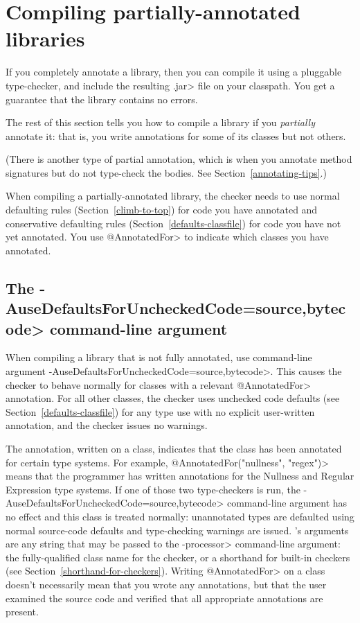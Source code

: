 \section{Compiling partially-annotated libraries\label{compiling-libraries}}

If you completely annotate a library, then you can compile it using a
pluggable type-checker, and include the resulting \<.jar> file on your
classpath.  You get a guarantee that the library contains no errors.

The rest of this section tells you how to compile a library if you
\emph{partially} annotate it:  that is, you write annotations for some of its
classes but not others.

(There is another type of partial annotation, which is when you annotate
method signatures but do not type-check the bodies.
See Section~\ref{annotating-tips}.)

When compiling a partially-annotated library, the checker needs to use normal
defaulting rules (Section~\ref{climb-to-top}) for code you have annotated and
conservative defaulting rules (Section~\ref{defaults-classfile}) for
code you have not yet annotated.
You use \<@AnnotatedFor> to indicate which classes you have annotated.



\subsection{The \<-AuseDefaultsForUncheckedCode=source,bytecode> command-line argument\label{AuseDefaultsForUncheckedCodesource}}

\begin{sloppypar}
When compiling a library that is not fully annotated, use command-line
argument \<-AuseDefaultsForUncheckedCode=source,bytecode>.  This causes
the checker to behave normally for classes with a relevant \<@AnnotatedFor>
annotation.  For all other classes, the checker uses unchecked code defaults
(see Section~\ref{defaults-classfile}) for any type use with no explicit
user-written annotation, and the checker issues no warnings.
\end{sloppypar}

The  annotation, written on a
class, indicates that the class has been annotated for certain type
systems.  For example, \<@AnnotatedFor(\ttlcb"nullness", "regex"\ttrcb)> means that
the programmer has written annotations for the Nullness and Regular
Expression type systems.  If one of those two type-checkers is run,
the \<-AuseDefaultsForUncheckedCode=source,bytecode> command-line argument
has no effect and this class is treated normally:
unannotated types are defaulted using normal source-code
defaults and type-checking warnings are issued.
's arguments are any string that
may be passed to the \<-processor> command-line argument:  the
fully-qualified class name for the checker, or a shorthand for built-in
checkers (see Section~\ref{shorthand-for-checkers}).
Writing \<@AnnotatedFor> on a class doesn't necessarily mean that you wrote
any annotations, but that the user examined the source code and verified
that all appropriate annotations are present.

